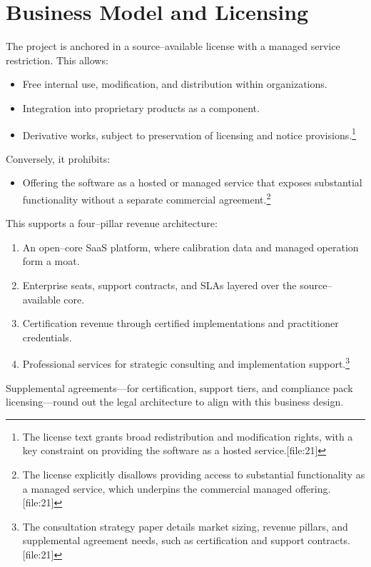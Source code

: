 \documentclass[11pt]{article}
\begin{document}
\section{Business Model and Licensing}

The project is anchored in a source--available license with a managed service restriction. This allows:
\begin{itemize}[leftmargin=*]
  \item Free internal use, modification, and distribution within organizations.
  \item Integration into proprietary products as a component.
  \item Derivative works, subject to preservation of licensing and notice provisions.\footnote{The license text grants broad redistribution and modification rights, with a key constraint on providing the software as a hosted service.[file:21]} 
\end{itemize}

Conversely, it prohibits:
\begin{itemize}[leftmargin=*]
  \item Offering the software as a hosted or managed service that exposes substantial functionality without a separate commercial agreement.\footnote{The license explicitly disallows providing access to substantial functionality as a managed service, which underpins the commercial managed offering.[file:21]} 
\end{itemize}

This supports a four--pillar revenue architecture:
\begin{enumerate}[leftmargin=*]
  \item An open--core SaaS platform, where calibration data and managed operation form a moat.
  \item Enterprise seats, support contracts, and SLAs layered over the source--available core.
  \item Certification revenue through certified implementations and practitioner credentials.
  \item Professional services for strategic consulting and implementation support.\footnote{The consultation strategy paper details market sizing, revenue pillars, and supplemental agreement needs, such as certification and support contracts.[file:21]} 
\end{enumerate}

Supplemental agreements---for certification, support tiers, and compliance pack licensing---round out the legal architecture to align with this business design.
\end{document}

